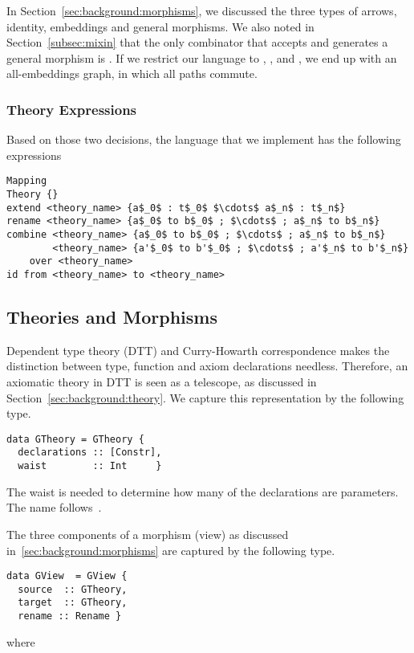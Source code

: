 In Section~\ref{sec:background:morphisms}, we discussed the three types of arrows, identity, embeddings and general morphisms. We also noted in Section~\ref{subsec:mixin} that the only combinator that accepts and generates a general morphism is . If we restrict our language to , , and , we end up with an all-embeddings graph, in which all paths commute.

\subsubsection{Theory Expressions}
\label{sec:impl:expressions}
Based on those two decisions, the language that we implement has the following expressions
\begin{lstlisting}[mathescape]
Mapping
Theory {}
extend <theory_name> {a$_0$ : t$_0$ $\cdots$ a$_n$ : t$_n$}
rename <theory_name> {a$_0$ to b$_0$ ; $\cdots$ ; a$_n$ to b$_n$}
combine <theory_name> {a$_0$ to b$_0$ ; $\cdots$ ; a$_n$ to b$_n$}
        <theory_name> {a'$_0$ to b'$_0$ ; $\cdots$ ; a'$_n$ to b'$_n$}
    over <theory_name>
id from <theory_name> to <theory_name>     
\end{lstlisting} 


\subsection{Theories and Morphisms}
Dependent type theory (DTT) and Curry-Howarth correspondence makes the distinction between type, function and axiom declarations needless. Therefore, an axiomatic theory in DTT is seen as a telescope, as discussed in Section~\ref{sec:background:theory}. We capture this representation by the following type. 
\begin{verbatim}
data GTheory = GTheory {
  declarations :: [Constr],
  waist        :: Int     }
\end{verbatim}
The waist is needed to determine how many of the declarations are parameters. The name follows~\cite{alhassy2019}. 

The three components of a morphism (view) as discussed in~\ref{sec:background:morphisms} are captured by the following type. 
\begin{verbatim}
data GView  = GView {
  source  :: GTheory,
  target  :: GTheory,
  rename :: Rename }  
\end{verbatim}
where 

